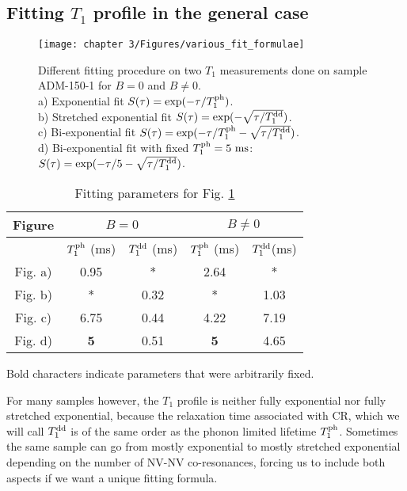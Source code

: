 \documentclass[a4paper,11pt]{report}
\begin{document}
\begin{refsection}
\subsection{Fitting $T_1$ profile in the general case}

\begin{figure}[h]
\centering
\texttt{[image: chapter 3/Figures/various\_fit\_formulae]}
\caption{Different fitting procedure on two $T_1$ measurements done on sample ADM-150-1 for $B=0$ and $B\neq0$. \\ a) Exponential fit $S(\tau)=\exp (-\tau/T_1^{\rm ph})$. \\ b) Stretched exponential fit $S(\tau)=\exp (-\sqrt{\tau/T_1^{\rm dd}})$. \\ c) Bi-exponential fit $S(\tau)=\exp (-\tau/T_1^{\rm ph} -\sqrt{\tau/T_1^{\rm dd}})$. \\ d) Bi-exponential fit with fixed $T_1^{\rm ph}=5\ \rm ms$: $S(\tau)=\exp (-\tau/5 -\sqrt{\tau/T_1^{\rm dd}})$.}
\label{various_fit_formulae}
\end{figure}

\begin{table}[htbp]
\centering
\caption{Fitting parameters for Fig.
 \ref{various_fit_formulae}}
 \label{fitting table}
\begin{tabular}{c|cc|cc}
\toprule
Figure &  \multicolumn{2}{c}{$B=0$} & \multicolumn{2}{c}{$B\neq0$}\\
\midrule
{} &  $T_1^{\rm ph}$ (ms)& $T_1^{\rm dd}$ (ms)&  $T_1^{\rm ph}$ (ms)& $T_1^{\rm dd}$(ms)\\
Fig. a) & 0.95 & * & 2.64 & * \\
Fig. b) & * & 0.32 & * & 1.03  \\
Fig. c) & 6.75 & 0.44 & 4.22 & 7.19 \\
Fig. d) & \textbf{5} & 0.51 & \textbf{5} & 4.65 \\
\bottomrule
\end{tabular}

Bold characters indicate parameters that were arbitrarily fixed.
\end{table}

For many samples however, the $T_1$ profile is neither fully exponential nor fully stretched exponential, because the relaxation time associated with CR, which we will call $T_1^{\rm dd}$ is of the same order as the phonon limited lifetime $T_1^{\rm ph}$. Sometimes the same sample can go from mostly exponential to mostly stretched exponential depending on the number of NV-NV co-resonances, forcing us to include both aspects if we want a unique fitting formula.


\end{refsection}
\end{document}
